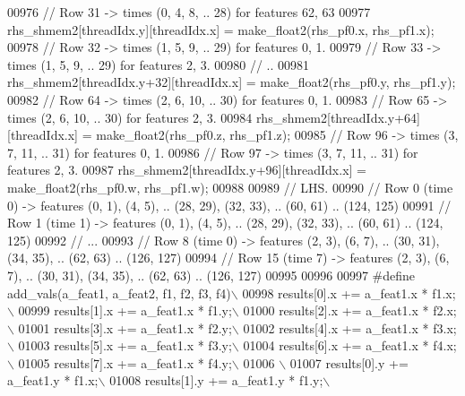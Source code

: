 \begin{DoxyCode}
00976     \textcolor{comment}{// Row 31 -> times (0, 4, 8, .. 28) for features 62, 63}
00977     rhs\_shmem2[threadIdx.y][threadIdx.x] = make\_float2(rhs\_pf0.x, rhs\_pf1.x);
00978     \textcolor{comment}{// Row 32 -> times (1, 5, 9, .. 29) for features 0, 1.}
00979     \textcolor{comment}{// Row 33 -> times (1, 5, 9, .. 29) for features 2, 3.}
00980     \textcolor{comment}{// ..}
00981     rhs\_shmem2[threadIdx.y+32][threadIdx.x] = make\_float2(rhs\_pf0.y, rhs\_pf1.y);
00982     \textcolor{comment}{// Row 64 -> times (2, 6, 10, .. 30) for features 0, 1.}
00983     \textcolor{comment}{// Row 65 -> times (2, 6, 10, .. 30) for features 2, 3.}
00984     rhs\_shmem2[threadIdx.y+64][threadIdx.x] = make\_float2(rhs\_pf0.z, rhs\_pf1.z);
00985     \textcolor{comment}{// Row 96 -> times (3, 7, 11, .. 31) for features 0, 1.}
00986     \textcolor{comment}{// Row 97 -> times (3, 7, 11, .. 31) for features 2, 3.}
00987     rhs\_shmem2[threadIdx.y+96][threadIdx.x] = make\_float2(rhs\_pf0.w, rhs\_pf1.w);
00988 
00989     \textcolor{comment}{// LHS.}
00990     \textcolor{comment}{// Row 0 (time 0) -> features (0, 1), (4, 5), .. (28, 29), (32, 33), ..  (60, 61) .. (124, 125)}
00991     \textcolor{comment}{// Row 1 (time 1) -> features (0, 1), (4, 5), .. (28, 29), (32, 33), ..  (60, 61) .. (124, 125)}
00992     \textcolor{comment}{// ...}
00993     \textcolor{comment}{// Row 8 (time 0) -> features (2, 3), (6, 7), .. (30, 31), (34, 35), ..  (62, 63) .. (126, 127)}
00994     \textcolor{comment}{// Row 15 (time 7) -> features (2, 3), (6, 7), .. (30, 31), (34, 35), ..  (62, 63) .. (126, 127)}
00995 
00996 
00997 \textcolor{preprocessor}{#define add\_vals(a\_feat1, a\_feat2, f1, f2, f3, f4)\(\backslash\)}
00998 \textcolor{preprocessor}{      results[0].x += a\_feat1.x * f1.x;\(\backslash\)}
00999 \textcolor{preprocessor}{      results[1].x += a\_feat1.x * f1.y;\(\backslash\)}
01000 \textcolor{preprocessor}{      results[2].x += a\_feat1.x * f2.x;\(\backslash\)}
01001 \textcolor{preprocessor}{      results[3].x += a\_feat1.x * f2.y;\(\backslash\)}
01002 \textcolor{preprocessor}{      results[4].x += a\_feat1.x * f3.x;\(\backslash\)}
01003 \textcolor{preprocessor}{      results[5].x += a\_feat1.x * f3.y;\(\backslash\)}
01004 \textcolor{preprocessor}{      results[6].x += a\_feat1.x * f4.x;\(\backslash\)}
01005 \textcolor{preprocessor}{      results[7].x += a\_feat1.x * f4.y;\(\backslash\)}
01006 \textcolor{preprocessor}{\(\backslash\)}
01007 \textcolor{preprocessor}{      results[0].y += a\_feat1.y * f1.x;\(\backslash\)}
01008 \textcolor{preprocessor}{      results[1].y += a\_feat1.y * f1.y;\(\backslash\)}

\end{DoxyCode}
